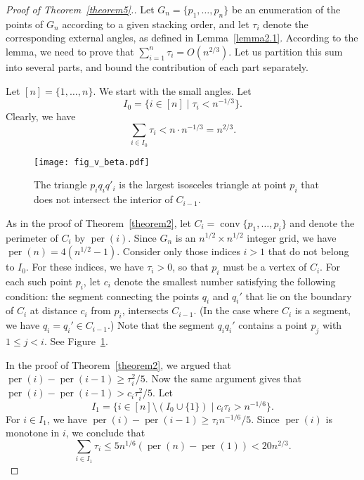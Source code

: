 \documentclass[11pt]{article}
\DeclareMathOperator{\conv}{\mathrm{conv}}
\DeclareMathOperator{\per}{\mathrm{per}}
\begin{document}
\begin{proof}[Proof of Theorem~\ref{theorem5}.]
Let $G_n=\{p_1,\ldots,p_n\}$ be an enumeration of the points of $G_n$ according to a given stacking order, and let $\tau_i$ denote the corresponding external angles, as defined in Lemma~\ref{lemma2.1}. According to the lemma, we need to prove that $\sum_{i=1}^n\tau_i=O(n^{2/3})$. Let us partition this sum into several parts, and bound the contribution of each part separately.

Let $[n]=\{1,\ldots,n\}$. We start with the small angles. Let
$$I_0=\{i\in[n]\mid\tau_i<n^{-1/3}\}.$$ Clearly, we have $$\sum_{i\in
I_0}\tau_i<n\cdot n^{-1/3}=n^{2/3}.$$

\begin{figure}
\centerline{\texttt{[image: fig\_v\_beta.pdf]}}
\caption{\label{fig_v_beta}The triangle $p_iq_iq'_i$ is the largest isosceles triangle at point $p_i$ that does not intersect the interior of $C_{i-1}$.}
\end{figure}

As in the proof of Theorem~\ref{theorem2}, let $C_i=\conv\{p_1,\ldots,p_i\}$ and denote the perimeter of $C_i$ by $\per(i)$. Since $G_n$ is an $n^{1/2}\times n^{1/2}$ integer grid, we have $\per(n)=4(n^{1/2}-1)$. Consider only those indices $i>1$ that do not belong to $I_0$. For these indices, we have $\tau_i>0$, so that $p_i$ must be a vertex of $C_i$. For each such point $p_i$, let $c_i$ denote the smallest number satisfying the following condition: the segment connecting the points $q_i$ and $q_i'$ that lie on the boundary of $C_i$ at distance $c_i$ from $p_i$, intersects $C_{i-1}$. (In the case where $C_i$ is a segment, we have $q_i=q_i'\in C_{i-1}$.) Note that the segment $q_iq_i'$ contains a point $p_j$ with $1\le j<i$.
See Figure~\ref{fig_v_beta}.

In the proof of Theorem~\ref{theorem2}, we argued that $\per(i)-\per(i-1)\ge\tau_i^2/5$. Now the same
argument gives that $\per(i)-\per(i-1)>c_i\tau_i^2/5$. Let
$$I_1=\{i\in[n]\setminus(I_0\cup\{1\})\mid c_i\tau_i>n^{-1/6}\}.$$ For $i\in
I_1$, we have $\per(i)-\per(i-1)\ge\tau_in^{-1/6}/5$. Since $\per(i)$ is
monotone in $i$, we conclude that $$\sum_{i\in
I_1}\tau_i\le5n^{1/6}(\per(n)-\per(1))<20n^{2/3}.$$


\end{proof}
\end{document}
